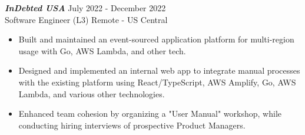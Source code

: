 {\sl \textbf{InDebted USA}} \hfill July 2022 - December 2022 \\
Software Engineer (L3) \hfill Remote - US Central
\begin{itemize}
    \item Built and maintained an event-sourced application platform for multi-region usage with Go, AWS Lambda, and other tech.
    \item Designed and implemented an internal web app to integrate manual processes with the existing platform using React/TypeScript, AWS Amplify, Go, AWS Lambda, and various other technologies.
    \item Enhanced team cohesion by organizing a "User Manual" workshop, while conducting hiring interviews of prospective Product Managers.
\end{itemize}
